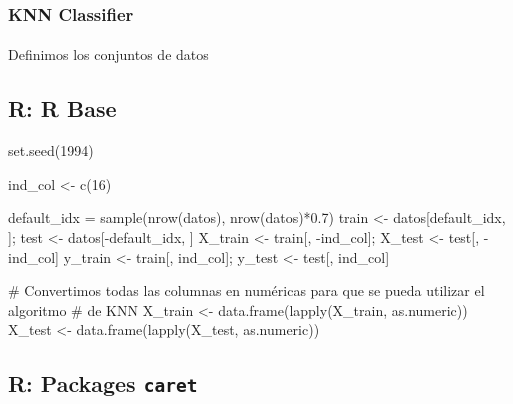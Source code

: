 \documentclass[
  letterpaper,
  DIV=11,
  numbers=noendperiod]{scrartcl}
\makeatletter
\let\oldparagraph\paragraph
\renewcommand{\paragraph}{
    \@ifstar
      \xxxParagraphStar
      \xxxParagraphNoStar
  }
\newcommand{\xxxParagraphStar}[1]{\oldparagraph*{#1}\mbox{}}
\newcommand{\xxxParagraphNoStar}[1]{\oldparagraph{#1}\mbox{}}
\newenvironment{Shaded}{\begin{snugshade}}{\end{snugshade}}
\newcommand{\CommentTok}[1]{\textcolor[rgb]{0.37,0.37,0.37}{#1}}
\newcommand{\DecValTok}[1]{\textcolor[rgb]{0.68,0.00,0.00}{#1}}
\newcommand{\FloatTok}[1]{\textcolor[rgb]{0.68,0.00,0.00}{#1}}
\newcommand{\FunctionTok}[1]{\textcolor[rgb]{0.28,0.35,0.67}{#1}}
\newcommand{\NormalTok}[1]{\textcolor[rgb]{0.00,0.23,0.31}{#1}}
\newcommand{\OtherTok}[1]{\textcolor[rgb]{0.00,0.23,0.31}{#1}}
\newcommand{\SpecialCharTok}[1]{\textcolor[rgb]{0.37,0.37,0.37}{#1}}
\makeatother
\begin{document}
\subsubsection{KNN Classifier}\label{knn-classifier}

\paragraph{Definimos los conjuntos de
datos}\label{definimos-los-conjuntos-de-datos}

\subsection{R: R Base}

\begin{Shaded}
\begin{Highlighting}[]
\FunctionTok{set.seed}\NormalTok{(}\DecValTok{1994}\NormalTok{)}

\NormalTok{ind\_col }\OtherTok{\textless{}{-}} \FunctionTok{c}\NormalTok{(}\DecValTok{16}\NormalTok{)}

\NormalTok{default\_idx }\OtherTok{=} \FunctionTok{sample}\NormalTok{(}\FunctionTok{nrow}\NormalTok{(datos), }\FunctionTok{nrow}\NormalTok{(datos)}\SpecialCharTok{*}\FloatTok{0.7}\NormalTok{)}
\NormalTok{train }\OtherTok{\textless{}{-}}\NormalTok{ datos[default\_idx, ]; test }\OtherTok{\textless{}{-}}\NormalTok{ datos[}\SpecialCharTok{{-}}\NormalTok{default\_idx, ]}
\NormalTok{X\_train }\OtherTok{\textless{}{-}}\NormalTok{ train[, }\SpecialCharTok{{-}}\NormalTok{ind\_col]; X\_test }\OtherTok{\textless{}{-}}\NormalTok{ test[, }\SpecialCharTok{{-}}\NormalTok{ind\_col]}
\NormalTok{y\_train }\OtherTok{\textless{}{-}}\NormalTok{ train[, ind\_col]; y\_test }\OtherTok{\textless{}{-}}\NormalTok{ test[, ind\_col]}

\CommentTok{\# Convertimos todas las columnas en numéricas para que se pueda utilizar el algoritmo}
\CommentTok{\# de KNN}
\NormalTok{X\_train }\OtherTok{\textless{}{-}} \FunctionTok{data.frame}\NormalTok{(}\FunctionTok{lapply}\NormalTok{(X\_train, as.numeric))}
\NormalTok{X\_test }\OtherTok{\textless{}{-}} \FunctionTok{data.frame}\NormalTok{(}\FunctionTok{lapply}\NormalTok{(X\_test, as.numeric))}
\end{Highlighting}
\end{Shaded}

\subsection{\texorpdfstring{R: Packages
\texttt{caret}}{R: Packages caret}}
\end{document}
